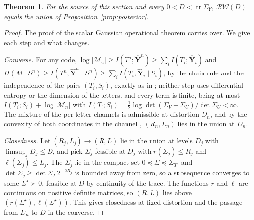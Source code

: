 \documentclass[11pt,onecolumn]{IEEEtran}
\newtheorem{theorem}{Theorem}
\newcommand{\tr}{\operatorname{tr}}
\newcommand{\hYv}{\hat{\mathbf Y}}
\newcommand{\RW}{\mathcal{R}\!\mathcal{W}}
\begin{document}
\begin{theorem}\label{thm:op}
For the source of this section and every $0<D<\tr\Sigma_Y$, $\RW(D)$
equals the union of Proposition~\ref{prop:posterior}.
\end{theorem}

\begin{proof}
The proof of the scalar Gaussian operational theorem
\cite[Theorem~29]{bond2026tit} carries over. We give each step and what
changes.

\emph{Converse.} For any code, $\log|\mathcal M_n|\ge I(T^n;\hYv^n)\ge\sum_i
I(T_i;\hYv_i)$ and $H(M\mid S^n)\ge I(T^n;\hYv^n\mid S^n)\ge\sum_i
I(T_i;\hYv_i\mid S_i)$, by the chain rule and the independence of the
pairs $(T_i,S_i)$, exactly as in \cite[Theorem~29]{bond2026tit}; neither
step uses differential entropy or the dimension of the letters, and every
term is finite, being at most $I(T_i;S_i)+\log|\mathcal M_n|$ with $I(T_i;S_i)=\tfrac12\log\det(\Sigma_V+\Sigma_U)/\det\Sigma_U<\infty$.
The mixture of the per-letter channels is admissible at distortion $D_n$,
and by the convexity of both coordinates in the channel
\cite[Lemma~3 and Remark~4]{bond2026tit}, $(R_n,L_n)$ lies in the union at
$D_n$.

\emph{Closedness.} Let $(R_j,L_j)\to(R,L)$ lie in the union at levels
$D_j$ with $\limsup_jD_j\le D$, and pick $\Sigma_j$ feasible at $D_j$ with
$r(\Sigma_j)\le R_j$ and $\ell(\Sigma_j)\le L_j$. The $\Sigma_j$ lie in the
compact set $0\preceq\Sigma\preceq\Sigma_T$, and
$\det\Sigma_j\ge\det\Sigma_T\,2^{-2R_j}$ is bounded away from zero, so a
subsequence converges to some $\Sigma^\star\succ0$, feasible at $D$ by
continuity of the trace. The functions $r$ and $\ell$ are continuous on
positive definite matrices, so $(R,L)$ lies above
$(r(\Sigma^\star),\ell(\Sigma^\star))$. This gives closedness at fixed
distortion and the passage from $D_n$ to $D$ in the converse.


\end{proof}
\end{document}
